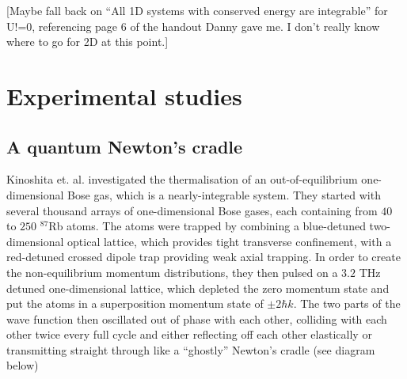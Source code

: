 \documentclass[a4paper, 10pt]{article}
\theoremstyle{plain}
\begin{document}
 [Maybe fall back on ``All 1D systems with conserved
energy are integrable'' for U!=0, referencing page 6 of the handout Danny gave
me. I don't really know where to go for 2D at this point.]


\section{Experimental studies}

\subsection{A quantum Newton's cradle}

Kinoshita et. al. investigated \cite{Kinoshita2006} the thermalisation of an
out-of-equilibrium one-dimensional Bose gas, which is a  nearly-integrable system. They
started with several thousand arrays of one-dimensional Bose gases, each
containing from $40$ to $250$ $^{87}$Rb atoms. The atoms were trapped by
combining a blue-detuned  two-dimensional optical lattice, which provides
tight transverse confinement, with a red-detuned crossed dipole trap
providing weak axial trapping. In order
to create the non-equilibrium momentum distributions, they then pulsed on a
$3.2$ THz detuned one-dimensional lattice, which depleted the zero momentum state
and put the atoms in a superposition momentum state of $\pm2\hbar k$. The two
parts of the wave function then oscillated out of phase with each other,
colliding with each other twice every full cycle and either reflecting off
each other elastically or transmitting straight through like a ``ghostly''
Newton's cradle (see diagram below)
\end{document}
